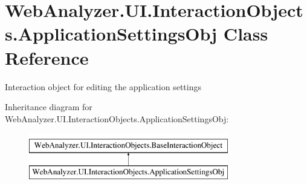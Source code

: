 \hypertarget{class_web_analyzer_1_1_u_i_1_1_interaction_objects_1_1_application_settings_obj}{}\section{Web\+Analyzer.\+U\+I.\+Interaction\+Objects.\+Application\+Settings\+Obj Class Reference}
\label{class_web_analyzer_1_1_u_i_1_1_interaction_objects_1_1_application_settings_obj}


Interaction object for editing the application settings  


Inheritance diagram for Web\+Analyzer.\+U\+I.\+Interaction\+Objects.\+Application\+Settings\+Obj\+:\begin{figure}[H]
\begin{center}
\leavevmode
\includegraphics[height=2.000000cm]{class_web_analyzer_1_1_u_i_1_1_interaction_objects_1_1_application_settings_obj}
\end{center}
\end{figure}
